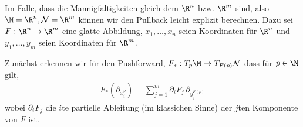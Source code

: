 \documentclass[letterpaper,10pt,german]{jupyterBook}
\begin{document}
\sphinxAtStartPar
Im Falle, dass die Mannigfaltigkeiten gleich dem \(\R^n\) bzw. \(\R^m\) sind, also \(\M=\R^n, \mathcal{N}=\R^m\) können wir den Pullback leicht explizit berechnen. Dazu sei \(F:\R^n\to\R^m\) eine glatte Abbildung, \(x_1,\ldots,x_n\) seien Koordinaten für \(\R^n\) und \(y_1,\ldots,y_m\) seien Koordinaten für \(\R^m\).

\sphinxAtStartPar
Zunächst erkennen wir für den Pushforward, \(F_\ast:T_p\M\to T_{F(p)}\mathcal{N}\) dass für \(p\in\M\) gilt,
\begin{equation*}
\begin{split}F_\ast(\partial_{x_i^p}) = \sum_{j=1}^m \partial_i F_j\, \partial_{y_j^{F(p)}}\end{split}
\end{equation*}
\sphinxAtStartPar
wobei \(\partial_i F_j\) die \(i\)\sphinxhyphen{}te partielle Ableitung (im klassichen Sinne) der \(j\)\sphinxhyphen{}ten Komponente von \(F\) ist.
\end{document}
